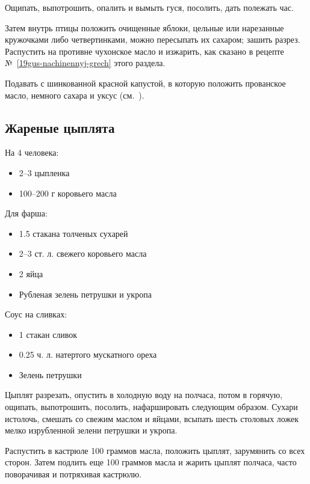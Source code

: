 Ощипать, выпотрошить, опалить и вымыть гуся, посолить, дать полежать час.

Затем внутрь птицы положить очищенные яблоки, цельные или нарезанные кружочками либо четвертинками, можно пересыпать их сахаром; зашить разрез. Распустить на противне чухонское масло и изжарить, как сказано в рецепте №~\ref{19gus-nachinennyj-grech} этого раздела.

Подавать с шинкованной красной капустой, в которую положить прованское масло, немного сахара и уксус (см.~).

\subsection{Жареные цыплята}

На 4 человека:

\begin{itemize}
	\item  2–3 цыпленка
    \item 100–200 г коровьего масла
\end{itemize}

Для фарша:

\begin{itemize}
	\item 1.5 стакана толченых сухарей
    \item 2–3 ст. л. свежего коровьего масла
    \item 2 яйца 
    \item Рубленая зелень петрушки и укропа
\end{itemize}

Соус на сливках:

\begin{itemize}
	\item 1 стакан сливок 
    \item 0.25 ч. л. натертого мускатного ореха 
    \item Зелень петрушки
\end{itemize}

Цыплят разрезать, опустить в холодную воду на полчаса, потом в горячую, ощипать, выпотрошить, посолить, нафаршировать следующим образом. Сухари истолочь, смешать со свежим маслом и яйцами, всыпать шесть столовых ложек мелко изрубленной зелени петрушки и укропа.

Распустить в кастрюле 100 граммов масла, положить цыплят, зарумянить со всех сторон. Затем подлить еще 100 граммов масла и жарить цыплят полчаса, часто поворачивая и потряхивая кастрюлю.

